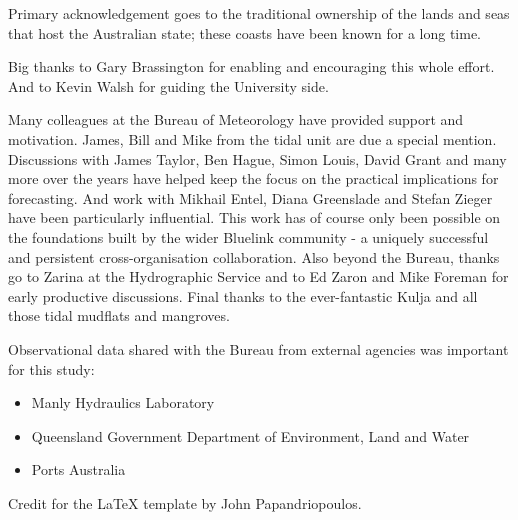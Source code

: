 
\begin{acknowledgements}

{\parindent0pt

Primary acknowledgement goes to the traditional ownership of the lands and seas that host the Australian state; these coasts have been known for a long time.
\newline{}
    
Big thanks to Gary Brassington for enabling and encouraging this whole effort.
And to Kevin Walsh for guiding the University side. 

\newline{}
Many colleagues at the Bureau of Meteorology have provided support and motivation. 
James, Bill and Mike from the tidal unit are due a special mention.    
Discussions with James Taylor, Ben Hague, Simon Louis, David Grant and many more over the years have helped keep the focus on the practical implications for forecasting.
And work with Mikhail Entel, Diana Greenslade and Stefan Zieger have been particularly influential.
\newline{}
This work has of course only been possible on the foundations built by the wider Bluelink community - a uniquely successful and persistent cross-organisation collaboration.
Also beyond the Bureau, thanks go to Zarina at the Hydrographic Service and to Ed Zaron and Mike Foreman for early productive discussions. 
\newline{}
Final thanks to the ever-fantastic Kulja and all those tidal mudflats and mangroves.  
\newline{}

Observational data shared with the Bureau from external agencies was important for this study:
\begin{itemize}
    \item Manly Hydraulics Laboratory %
    \item Queensland Government Department of Environment, Land and Water
    \item Ports Australia
\end{itemize}


Credit for the LaTeX template by John Papandriopoulos.  %

}   %
\end{acknowledgements}
